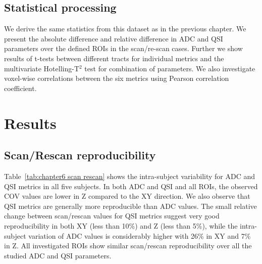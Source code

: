 \subsection{Statistical processing} We derive the same statistics from this dataset as in the previous chapter. We present the absolute difference and relative difference in ADC and \gls{QSI} parameters over the defined \glspl{ROI} in the scan/re-scan cases. Further we show results of t-tests between different tracts for individual metrics and the multivariate Hotelling-T$^2$ test for combination of parameters. We also investigate voxel-wise correlations between the six metrics using Pearson correlation coefficient.


\section{Results}
\subsection{Scan/Rescan reproducibility}
\label{par:chapter6 reproducibility}
Table~\ref{tab:chapter6 scan rescan} shows the intra-subject variability for ADC and QSI metrics in all five subjects. In both ADC and QSI and all \glspl{ROI}, the observed COV values are lower in Z compared to the XY direction. We also observe that QSI metrics are generally more reproducible than ADC values. The small relative change between scan/rescan values for QSI metrics suggest very good reproducibility in both XY (less than 10\%) and Z (less than 5\%), while the intra-subject variation of ADC values is considerably higher with 26\% in XY and 7\% in Z. All investigated \glspl{ROI} show similar scan/rescan reproducibility over all the studied ADC and QSI parameters.

